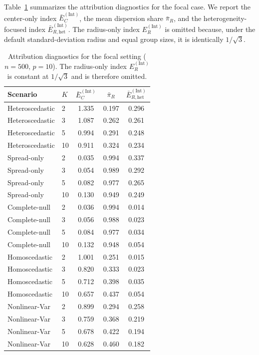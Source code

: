 \documentclass[preprint, times, 12pt, authoryear]{elsarticle}
\begin{document}
Table~\ref{tab:sim_level_iv} summarizes the attribution diagnostics for the focal case. We report the center-only index $\bar E_C^{(\mathrm{Int})}$, the mean dispersion share $\bar\pi_R$, and the heterogeneity-focused index $\bar E_{R,\mathrm{het}}^{(\mathrm{Int})}$. The radius-only index $E_R^{(\mathrm{Int})}$ is omitted because, under the default standard-deviation radius and equal group sizes, it is identically $1/\sqrt{3}$.

\begin{table}[ht]
	\centering
	\caption{Attribution diagnostics for the focal setting ($n=500$, $p=10$). The radius-only index $E_R^{(\mathrm{Int})}$ is constant at $1/\sqrt{3}$ and is therefore omitted.}
	\label{tab:sim_level_iv}
	\begin{tabular}{llccc}
		\toprule
		Scenario & $K$ & $\bar E_C^{(\mathrm{Int})}$ & $\bar\pi_R$ & $\bar E_{R,\mathrm{het}}^{(\mathrm{Int})}$ \\
		\midrule
		Heteroscedastic & 2  & 1.335 & 0.197 & 0.296 \\
		Heteroscedastic & 3  & 1.087 & 0.262 & 0.261 \\
		Heteroscedastic & 5  & 0.994 & 0.291 & 0.248 \\
		Heteroscedastic & 10 & 0.911 & 0.324 & 0.234 \\
		\midrule
		Spread-only     & 2  & 0.035 & 0.994 & 0.337 \\
		Spread-only     & 3  & 0.054 & 0.989 & 0.292 \\
		Spread-only     & 5  & 0.082 & 0.977 & 0.265 \\
		Spread-only     & 10 & 0.130 & 0.949 & 0.249 \\
		\midrule
		Complete-null   & 2  & 0.036 & 0.994 & 0.014 \\
		Complete-null   & 3  & 0.056 & 0.988 & 0.023 \\
		Complete-null   & 5  & 0.084 & 0.977 & 0.034 \\
		Complete-null   & 10 & 0.132 & 0.948 & 0.054 \\
		\midrule
		Homoscedastic   & 2  & 1.001 & 0.251 & 0.015 \\
		Homoscedastic   & 3  & 0.820 & 0.333 & 0.023 \\
		Homoscedastic   & 5  & 0.712 & 0.398 & 0.035 \\
		Homoscedastic   & 10 & 0.657 & 0.437 & 0.054 \\
		\midrule
		Nonlinear-Var   & 2  & 0.899 & 0.294 & 0.258 \\
		Nonlinear-Var   & 3  & 0.759 & 0.368 & 0.219 \\
		Nonlinear-Var   & 5  & 0.678 & 0.422 & 0.194 \\
		Nonlinear-Var   & 10 & 0.628 & 0.460 & 0.182 \\
		\bottomrule
	\end{tabular}
\end{table}
\end{document}
